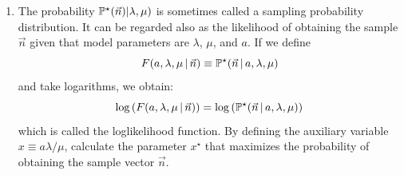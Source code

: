 \begin{enumerate}
\item The probability ${\mathbb P}^{\star}(\vec{n}) | \lambda, \mu)$ is sometimes called a sampling probability distribution. It can be regarded also as the likelihood of obtaining the sample $\vec{n}$ given that model parameters are $\lambda$, $\mu$, and $a$. If we define 
\begin{equation}
  F(a, \lambda, \mu \,|\, \vec{n}) \equiv {\mathbb P}^{\star}(\vec{n} \,|\, a, \lambda, \mu) 
\end{equation}
and take logarithms, we obtain: 
\begin{equation}
  \log \left( F(a, \lambda, \mu \,|\, \vec{n} ) \right) = \log \left( \Pb^{\star}(\vec{n} \,|\, a, \lambda, \mu) \right) 
%
\end{equation}
which is called the loglikelihood function. By defining the auxiliary variable $x \equiv a \lambda/\mu$, calculate the parameter $x^{\star}$ that maximizes the probability of obtaining the sample vector $\vec{n}$. 
\end{enumerate}

